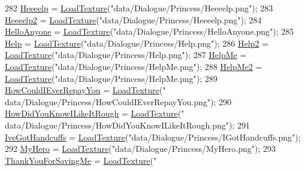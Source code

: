 \begin{DoxyCode}
282     \hyperlink{classDialogue_ae8a4d4f7a0a774ff022d6c81462befdf}{Heeeelp} = \hyperlink{classDialogue_a3fb8644f167af142d1413c0fa6b74434}{LoadTexture}(\textcolor{stringliteral}{"data/Dialogue/Princess/Heeeelp.png"});
283     \hyperlink{classDialogue_a8811756244b8c9381b7cff4f42cf366e}{Heeeelp2} = \hyperlink{classDialogue_a3fb8644f167af142d1413c0fa6b74434}{LoadTexture}(\textcolor{stringliteral}{"data/Dialogue/Princess/Heeeelp.png"});
284     \hyperlink{classDialogue_a051f743479e3808099f49ee71498d8f1}{HelloAnyone} = \hyperlink{classDialogue_a3fb8644f167af142d1413c0fa6b74434}{LoadTexture}(\textcolor{stringliteral}{"data/Dialogue/Princess/HelloAnyone.png"});
285     \hyperlink{classDialogue_a8b2703485db5802970e8acb6c9e83ef1}{Help} = \hyperlink{classDialogue_a3fb8644f167af142d1413c0fa6b74434}{LoadTexture}(\textcolor{stringliteral}{"data/Dialogue/Princess/Help.png"});
286     \hyperlink{classDialogue_ade9692a24d728546bf23f015388bf21a}{Help2} = \hyperlink{classDialogue_a3fb8644f167af142d1413c0fa6b74434}{LoadTexture}(\textcolor{stringliteral}{"data/Dialogue/Princess/Help.png"});
287     \hyperlink{classDialogue_af92b13e8cc50209ba797311840053c18}{HelpMe} = \hyperlink{classDialogue_a3fb8644f167af142d1413c0fa6b74434}{LoadTexture}(\textcolor{stringliteral}{"data/Dialogue/Princess/HelpMe.png"});
288     \hyperlink{classDialogue_aaa2332a8606f52efefb6cbd7c5440e88}{HelpMe2} = \hyperlink{classDialogue_a3fb8644f167af142d1413c0fa6b74434}{LoadTexture}(\textcolor{stringliteral}{"data/Dialogue/Princess/HelpMe.png"});
289     \hyperlink{classDialogue_a81623c019b01367bebfb907cd9dc6bc9}{HowCouldIEverRepayYou} = \hyperlink{classDialogue_a3fb8644f167af142d1413c0fa6b74434}{LoadTexture}(\textcolor{stringliteral}{"
      data/Dialogue/Princess/HowCouldIEverRepayYou.png"});
290     \hyperlink{classDialogue_a026bb6bfad700c2b1e2a6935b1dad15e}{HowDidYouKnowILikeItRough} = \hyperlink{classDialogue_a3fb8644f167af142d1413c0fa6b74434}{LoadTexture}(\textcolor{stringliteral}{"
      data/Dialogue/Princess/HowDidYouKnowILikeItRough.png"});
291     \hyperlink{classDialogue_a1ada52a5cd172b6157ede69ec57468e8}{IveGotHandcuffs} = \hyperlink{classDialogue_a3fb8644f167af142d1413c0fa6b74434}{LoadTexture}(\textcolor{stringliteral}{"data/Dialogue/Princess/IGotHandcuffs.png"});
292     \hyperlink{classDialogue_ab568d70405f23e8c9d6f90fa21c902d6}{MyHero} = \hyperlink{classDialogue_a3fb8644f167af142d1413c0fa6b74434}{LoadTexture}(\textcolor{stringliteral}{"data/Dialogue/Princess/MyHero.png"});
293     \hyperlink{classDialogue_a7a406be3bda409b2fdb23cef3ccfcbe0}{ThankYouForSavingMe} = \hyperlink{classDialogue_a3fb8644f167af142d1413c0fa6b74434}{LoadTexture}(\textcolor{stringliteral}{"
}
\end{DoxyCode}

